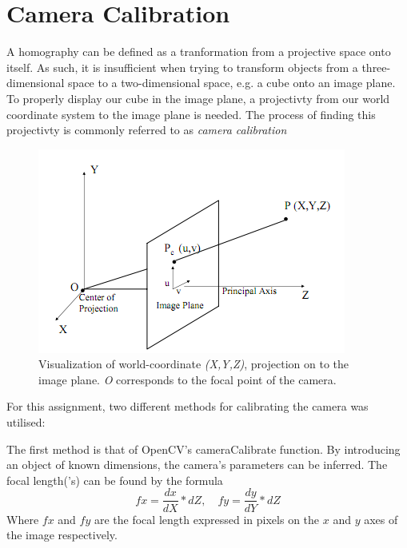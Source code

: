 \section{Camera Calibration}
A homography can be defined as a tranformation from a projective space onto
itself. As such, it is insufficient when trying to transform objects from a
three-dimensional space to a two-dimensional space, e.g. a cube onto an image
plane. To properly display our cube in the image plane, a projectivty from our
world coordinate system to the image plane is needed. The process of finding
this projectivty is commonly referred to as \emph{camera calibration}
\begin{figure}[htbp]
	\includegraphics{pics/cameraCalibration.png}
	\caption{Visualization of world-coordinate \emph{(X,Y,Z)}, projection on
	to the image plane. \emph{O} corresponds to the focal point of the
	camera.}
	\label{fig:calibtheory}
\end{figure}

For this assignment, two different methods for calibrating the camera
was utilised:

The first method is that of OpenCV's cameraCalibrate function. By introducing an
object of known dimensions, the camera's parameters can be inferred. The focal
length('s) can be found by the formula $$fx = \frac{dx}{dX} * dZ,\quad fy =
\frac{dy}{dY} * dZ$$ Where $fx$ and $fy$ are the focal length expressed in
pixels on the $x$ and $y$ axes of the image respectively.

